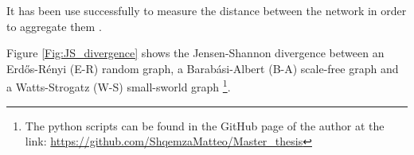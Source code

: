 It has been use successfully to measure the distance between the network in order to aggregate them \cite{multilayer}.

Figure \ref{Fig:JS_divergence} shows the Jensen-Shannon divergence between an Erd\H{o}s-Rényi (E-R) random graph, a Barab\'asi-Albert (B-A) scale-free graph and a Watts-Strogatz (W-S) small-sworld graph \footnote{The python scripts can be found in the GitHub page of the author at the link: \url{https://github.com/ShqemzaMatteo/Master_thesis}}.